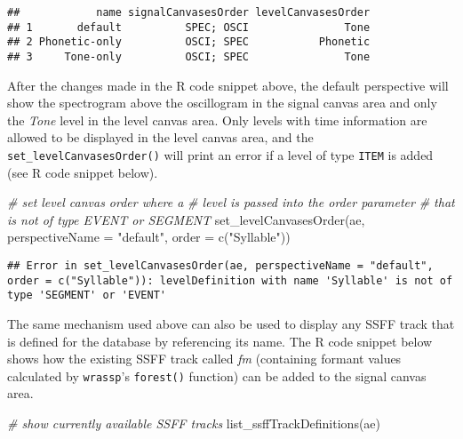 \documentclass[
]{book}
\newenvironment{Shaded}{\begin{snugshade}}{\end{snugshade}}
\newcommand{\AttributeTok}[1]{\textcolor[rgb]{0.77,0.63,0.00}{#1}}
\newcommand{\CommentTok}[1]{\textcolor[rgb]{0.56,0.35,0.01}{\textit{#1}}}
\newcommand{\FunctionTok}[1]{\textcolor[rgb]{0.00,0.00,0.00}{#1}}
\newcommand{\NormalTok}[1]{#1}
\newcommand{\StringTok}[1]{\textcolor[rgb]{0.31,0.60,0.02}{#1}}
\begin{document}
\begin{verbatim}
##            name signalCanvasesOrder levelCanvasesOrder
## 1       default          SPEC; OSCI               Tone
## 2 Phonetic-only          OSCI; SPEC           Phonetic
## 3     Tone-only          OSCI; SPEC               Tone
\end{verbatim}

After the changes made in the R code snippet above, the default perspective will show the spectrogram above the oscillogram in the signal canvas area and only the \emph{Tone} level in the level canvas area. Only levels with time information are allowed to be displayed in the level canvas area, and the \texttt{set\_levelCanvasesOrder()} will print an error if a level of type \texttt{ITEM} is added (see R code snippet below).

\begin{Shaded}
\begin{Highlighting}[]
\CommentTok{\# set level canvas order where a}
\CommentTok{\# level is passed into the order parameter}
\CommentTok{\# that is not of type EVENT or SEGMENT}
\FunctionTok{set\_levelCanvasesOrder}\NormalTok{(ae,}
                       \AttributeTok{perspectiveName =} \StringTok{"default"}\NormalTok{,}
                       \AttributeTok{order =} \FunctionTok{c}\NormalTok{(}\StringTok{"Syllable"}\NormalTok{))}
\end{Highlighting}
\end{Shaded}

\begin{verbatim}
## Error in set_levelCanvasesOrder(ae, perspectiveName = "default", order = c("Syllable")): levelDefinition with name 'Syllable' is not of type 'SEGMENT' or 'EVENT'
\end{verbatim}

The same mechanism used above can also be used to display any SSFF track that is defined for the database by referencing its name. The R code snippet below shows how the existing SSFF track called \emph{fm} (containing formant values calculated by \texttt{wrassp}'s \texttt{forest()} function) can be added to the signal canvas area.

\begin{Shaded}
\begin{Highlighting}[]
\CommentTok{\# show currently available SSFF tracks}
\FunctionTok{list\_ssffTrackDefinitions}\NormalTok{(ae)}
\end{Highlighting}
\end{Shaded}
\end{document}
